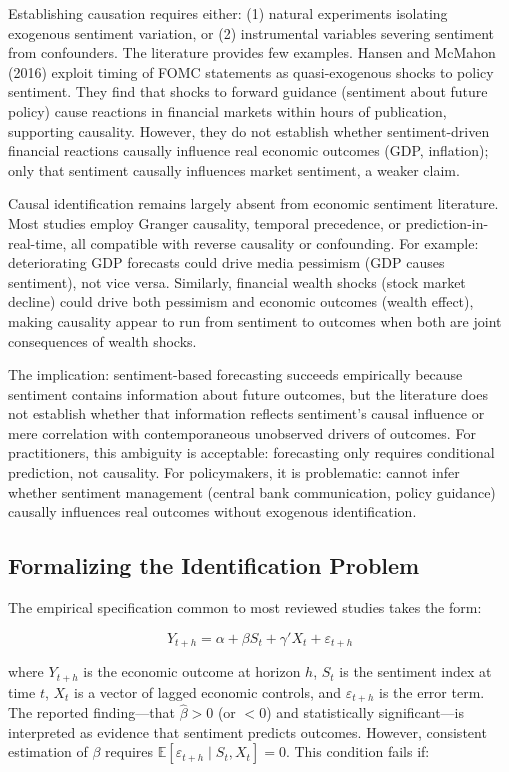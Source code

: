 \documentclass[11pt]{article}
\begin{document}
Establishing causation requires either: (1) natural experiments isolating exogenous sentiment variation, or (2) instrumental variables severing sentiment from confounders. The literature provides few examples. Hansen and McMahon (2016) exploit timing of FOMC statements as quasi-exogenous shocks to policy sentiment. They find that shocks to forward guidance (sentiment about future policy) cause reactions in financial markets within hours of publication, supporting causality. However, they do not establish whether sentiment-driven financial reactions causally influence real economic outcomes (GDP, inflation); only that sentiment causally influences market sentiment, a weaker claim.

Causal identification remains largely absent from economic sentiment literature. Most studies employ Granger causality, temporal precedence, or prediction-in-real-time, all compatible with reverse causality or confounding. For example: deteriorating GDP forecasts could drive media pessimism (GDP causes sentiment), not vice versa. Similarly, financial wealth shocks (stock market decline) could drive both pessimism and economic outcomes (wealth effect), making causality appear to run from sentiment to outcomes when both are joint consequences of wealth shocks.

The implication: sentiment-based forecasting succeeds empirically because sentiment contains information about future outcomes, but the literature does not establish whether that information reflects sentiment's causal influence or mere correlation with contemporaneous unobserved drivers of outcomes. For practitioners, this ambiguity is acceptable: forecasting only requires conditional prediction, not causality. For policymakers, it is problematic: cannot infer whether sentiment management (central bank communication, policy guidance) causally influences real outcomes without exogenous identification.

\subsection{Formalizing the Identification Problem}

The empirical specification common to most reviewed studies takes the form:

\begin{equation}
Y_{t+h} = \alpha + \beta S_t + \gamma' X_t + \varepsilon_{t+h}
\label{eq:causal}
\end{equation}

where $Y_{t+h}$ is the economic outcome at horizon $h$, $S_t$ is the sentiment index at time $t$, $X_t$ is a vector of lagged economic controls, and $\varepsilon_{t+h}$ is the error term. The reported finding---that $\hat{\beta} > 0$ (or $<0$) and statistically significant---is interpreted as evidence that sentiment predicts outcomes. However, consistent estimation of $\beta$ requires $\mathbb{E}[\varepsilon_{t+h} \mid S_t, X_t] = 0$. This condition fails if:
\end{document}
